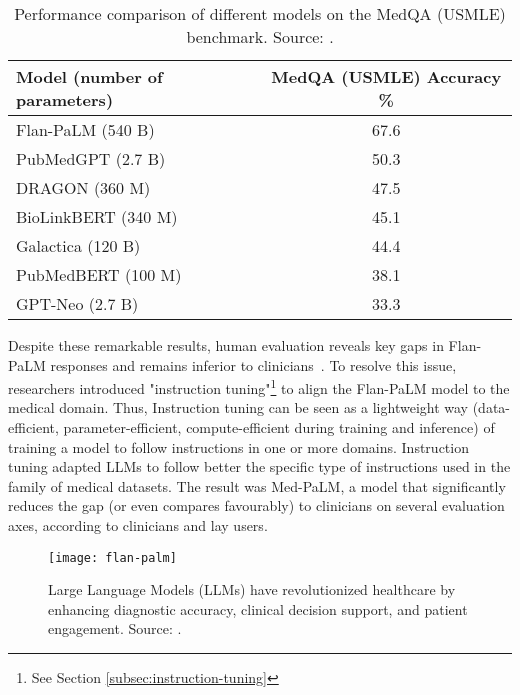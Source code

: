 \begin{table}[!h]
	\centering
	\begin{tabular}{@{}lc@{}}
		\toprule
		Model (number of parameters) & MedQA (USMLE) Accuracy \% \\
		\midrule
		Flan-PaLM (540 B)            & 67.6                      \\
		PubMedGPT (2.7 B)            & 50.3                      \\
		DRAGON (360 M)               & 47.5                      \\
		BioLinkBERT (340 M)          & 45.1                      \\
		Galactica (120 B)            & 44.4                      \\
		PubMedBERT (100 M)           & 38.1                      \\
		GPT-Neo (2.7 B)              & 33.3                      \\
		\bottomrule
	\end{tabular}
	\caption{Performance comparison of different models on the MedQA (USMLE) benchmark. Source: \textcite{singhal2022large}.}
	\label{tab:medqa_performance}
\end{table}

Despite these remarkable results, human evaluation reveals key gaps in Flan-PaLM responses and remains inferior to clinicians~\cite{singhal2022large}.
To resolve this issue, researchers introduced "instruction tuning"\footnote{See Section \ref{subsec:instruction-tuning}} to align the Flan-PaLM model to the medical domain.
Thus, Instruction tuning can be seen as a lightweight way (data-efficient, parameter-efficient, compute-efficient during training and inference) of training a model to follow instructions in one or more domains.
Instruction tuning adapted LLMs to follow better the specific type of instructions used in the family of medical datasets.
The result was Med-PaLM, a model that significantly reduces the gap (or even compares favourably) to clinicians on several evaluation axes, according to clinicians and lay users.

\begin{figure}[h!]
	\centering
	\texttt{[image: flan-palm]}
	\caption{Large Language Models (LLMs) have revolutionized healthcare by enhancing diagnostic accuracy, clinical decision support, and patient engagement. Source: \textcite{singhal2022large}.}
	\label{fig:llm-healthcare}
\end{figure}

